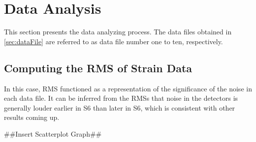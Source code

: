 \documentclass[aps,prd,preprint]{revtex4}
\begin{document}
\section{Data Analysis}
This section presents the data analyzing process. The data files obtained in \ref{sec:dataFile} are referred to as data file number one to ten, respectively.

\subsection{Computing the RMS of Strain Data}
In this case, RMS functioned as a representation of the significance of the noise in each data file. It can be inferred from the RMSs that noise in the detectors is generally louder earlier in S6 than later in S6, which is consistent with other results coming up.
\par\#\#Insert Scatterplot Graph\#\#
\end{document}
